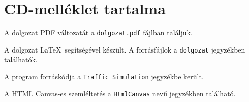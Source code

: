 \newpage
\section*{CD-melléklet tartalma}

\noindent A dolgozat PDF változatát a \texttt{dolgozat.pdf} fájlban találjuk.

\bigskip

\noindent A dolgozat \LaTeX\ segítségével készült. A forrásfájlok a \texttt{dolgozat} jegyzékben találhatók.

\bigskip

\noindent A program forráskódja a \texttt{Traffic Simulation} jegyzékbe került.

\bigskip

\noindent A HTML Canvas-es szemléltetés a \texttt{HtmlCanvas} nevű jegyzékben található.
